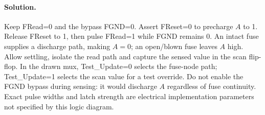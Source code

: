 \documentclass[11pt]{article}
\newcommand{\sol}{\paragraph{Solution.}}
\begin{document}
\sol Keep FRead=0 and the bypass FGND=0. Assert FReset=0 to precharge $A$ to 1.
Release FReset to 1, then pulse FRead=1 while FGND remains 0.
An intact fuse supplies a discharge path, making $A=0$; an open/blown fuse
leaves $A$ high. Allow settling, isolate the read path and capture the sensed
value in the scan flip-flop. In the drawn mux, Test\_Update=0 selects the
fuse-node path; Test\_Update=1 selects the scan value for a test override.
Do not enable the FGND bypass during sensing: it would discharge $A$
regardless of fuse continuity. Exact pulse widths and latch strength are
electrical implementation parameters not specified by this logic diagram.
\end{document}
